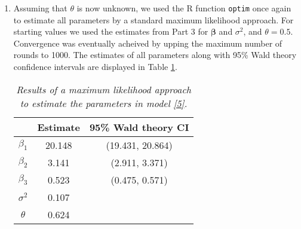 \documentclass[12pt]{article}
\begin{document}
\begin{enumerate}
  \item Assuming that $\theta$ is now unknown, we used the R function \texttt{optim} once again to estimate all parameters by a standard maximum
    likelihood approach. For starting values we used the estimates from Part 3 for $\bm{\beta}$ and $\sigma^{2}$, and $\theta = 0.5$. Convergence was
    eventually acheived by upping the maximum number of rounds to 1000. The estimates of all parameters along with 95\% Wald theory confidence
    intervals are displayed in Table \ref{tab6.1}.

    \begin{table}[h]
      \caption{\emph{Results of a maximum likelihood approach to estimate the parameters in model \eqref{5}.}}
      \vspace{.2cm}
      \centering
      \begin{tabular}{|c|c|c|}
        \hline
        & Estimate & 95\% Wald theory CI \\
        \hline
        $\beta_1$ & 20.148 & (19.431, 20.864) \\
        \hline
        $\beta_2$ & 3.141 & (2.911, 3.371) \\
        \hline
        $\beta_3$ & 0.523 & (0.475, 0.571) \\
        \hline
        $\sigma^{2}$ & 0.107 & \\
        \hline
        $\theta$ & 0.624 & \\
        \hline
      \end{tabular}
      \label{tab6.1}
    \end{table}

\end{enumerate}
\end{document}
